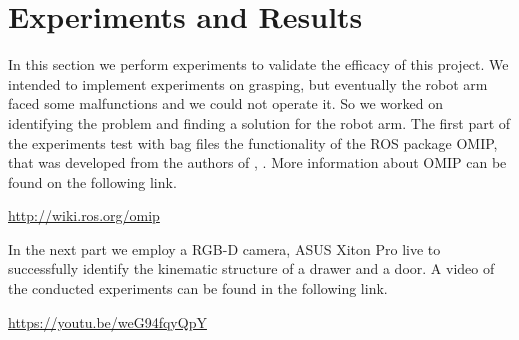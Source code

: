 \documentclass[letterpaper, 10 pt, conference]{ieeeconf}
\begin{document}
\section{Experiments and Results}\label{experim}
In this section we perform experiments to validate the efficacy of this project. We intended to implement experiments on grasping, but eventually the robot arm faced some malfunctions and we could not operate it. So we worked on identifying the problem and finding a solution for the robot arm. The first part of the experiments test with bag files the functionality of the ROS \cite{ROS} package OMIP, that was developed from the authors of \cite{martin2014online}, \cite{martin2016integrated}. More information about OMIP can be found on the following link.

\begin{center}
\url{http://wiki.ros.org/omip}
\end{center}

In the next part we employ a RGB-D camera, ASUS Xiton Pro live \cite{AsusXiton} to successfully identify the kinematic structure of a drawer and a door. A video of the conducted experiments can be found in the following link.

\begin{center}
\url{https://youtu.be/weG94fqyQpY}
\end{center}
\end{document}
